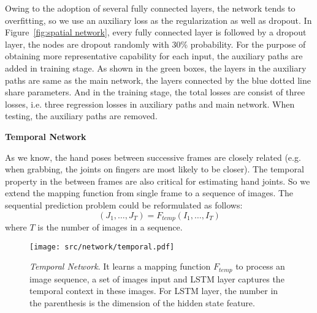 \documentclass[journal,comsoc]{IEEEtran}
\let\MYoriglatexcaption\caption
\renewcommand{\caption}[2][\relax]{\MYoriglatexcaption[#2]{#2}}
\def \J{\bm{\mathit{J}}}
\def \I{\mathit{I}}
\begin{document}
Owing to the adoption of several fully connected layers, the network tends to overfitting, so we use
an auxiliary loss as the regularization as well as dropout. In Figure~\ref{fig:spatial network},
every fully connected layer is followed by a dropout layer, the nodes are dropout randomly
with 30\% probability. For the purpose of obtaining more representative capability for each input,
the auxiliary paths are added in training stage. As shown in the green boxes, the layers in the
auxiliary paths are same as the main network, the layers connected by the blue dotted line
share parameters. And in the training stage, the total losses are consist of three losses,
i.e. three regression losses in auxiliary paths and main network. When testing, the auxiliary
paths are removed.\vspace{0.5em}

\vspace{1em}
\noindent \textbf{Temporal Network}\vspace{0.5em}\label{sec:temporal netowork}

As we know, the hand poses between successive frames are closely related (e.g. when grabbing, the joints
on fingers are most likely to be closer). The temporal property in the between frames are also critical for
estimating hand joints. So we extend the mapping function from single frame to a sequence of images. The
sequential prediction problem could be reformulated as follows:
\begin{equation}\label{eq:seq2seq}
(\J_1, \dots, \J_{T}) = F_{temp}(\I_1, \dots, \I_{T})
\end{equation}
where $T$ is the number of images in a sequence.

\begin{figure}[htbp]
\centering
    \texttt{[image: src/network/temporal.pdf]}
    \caption{\emph{Temporal Network}. It learns a mapping function $F_{temp}$ to process an image sequence,
    a set of images input and LSTM layer captures the temporal context in these images. For LSTM layer, the number
    in the parenthesis is the dimension of the hidden state feature.}
\label{fig:temporal network}
\end{figure}
\end{document}
